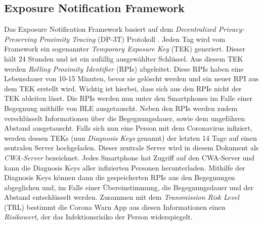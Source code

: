 \documentclass[conference,compsoc]{IEEEtran}
\begin{document}
\subsection{Exposure Notification Framework} \label{Ex_not_frame}
Das Exposure Notification Framework basiert auf dem \textit{Decentralized Privacy-Preserving Proximity Tracing} (DP-3T) Protokoll \cite{DP-3T}.
Jeden Tag wird vom Framework ein sogenannter \textit{Temporary Exposure Key} (TEK) generiert. Dieser hält 24 Stunden und ist ein zufällig ausgewählter Schlüssel. 
Aus diesem TEK werden \textit{Rolling Proximity Identifier} (RPIs) abgeleitet. 
Diese RPIs haben eine Lebensdauer von 10-15 Minuten, bevor sie gelöscht werden und ein neuer RPI aus dem TEK erstellt wird. Wichtig ist hierbei, 
dass sich aus den RPIs nicht der TEK ableiten lässt. 
Die RPIs werden nun unter den Smartphones im Falle einer Begegnung mithilfe von BLE ausgetauscht. Neben den RPIs werden zudem verschlüsselt Informationen über die Begegnungsdauer, sowie dem ungefähren Abstand ausgetauscht.
Falls sich nun eine Person mit dem Coronavirus infiziert, werden dessen TEKs (nun \textit{Diagnosis Keys} genannt) der letzten 14 Tage auf einen zentralen Server hochgeladen.
Dieser zentrale Server wird in diesem Dokument als \textit{CWA-Server} bezeichnet.
Jedes Smartphone hat Zugriff auf den CWA-Server und kann die Diagnosis Keys aller infizierten Personen herunterladen.
Mithilfe der Diagnosis Keys können dann die gespeicherten RPIs aus den Begegnungen abgeglichen und, im Falle einer Übereinstimmung, die Begegnungsdauer und der Abstand entschlüsselt werden. 
Zusammen mit dem \textit{Transmission Risk Level} (TRL) bestimmt die Corona Warn App aus diesen Informationen einen \textit{Risikowert}, der das Infektionsrisiko der Person widerspiegelt.
\end{document}
